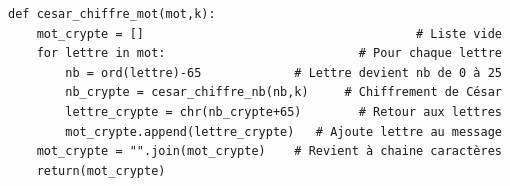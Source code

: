 \begin{frame}[fragile]

{\footnotesize
\begin{algo}[cesar.py (3)]
\begin{lstlisting}
def cesar_chiffre_mot(mot,k):
    mot_crypte = []                                      # Liste vide
    for lettre in mot:                           # Pour chaque lettre 
        nb = ord(lettre)-65             # Lettre devient nb de 0 à 25
        nb_crypte = cesar_chiffre_nb(nb,k)     # Chiffrement de César 
        lettre_crypte = chr(nb_crypte+65)        # Retour aux lettres
        mot_crypte.append(lettre_crypte)   # Ajoute lettre au message
    mot_crypte = "".join(mot_crypte)    # Revient à chaine caractères
    return(mot_crypte)
\end{lstlisting}  
\end{algo}
}

\end{frame}
% 
% 
%   
%   
%   
% 





